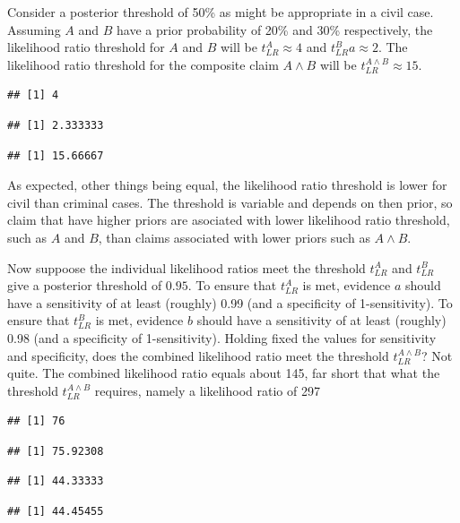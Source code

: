 \documentclass[10pt,dvipsnames,enabledeprecatedfontcommands]{scrartcl}
\begin{document}
Consider a posterior threshold of 50\% as might be appropriate in a
civil case. Assuming \(A\) and \(B\) have a prior probability of 20\%
and 30\% respectively, the likelihood ratio threshold for \(A\) and
\(B\) will be \(t_{LR}^{A}\approx 4\) and \(t_{LR}^{B}a\approx 2\). The
likelihood ratio threshold for the composite claim \(A \wedge B\) will
be \(t^{A\wedge B}_{LR}\approx 15\).

\begin{verbatim}
## [1] 4
\end{verbatim}

\begin{verbatim}
## [1] 2.333333
\end{verbatim}

\begin{verbatim}
## [1] 15.66667
\end{verbatim}

As expected, other things being equal, the likelihood ratio threshold is
lower for civil than criminal cases. The threshold is variable and
depends on then prior, so claim that have higher priors are asociated
with lower likelihood ratio threshold, such as \(A\) and \(B\), than
claims associated with lower priors such as \(A \wedge B\).

Now suppoose the individual likelihood ratios meet the threshold
\(t_{LR}^{A}\) and \(t_{LR}^{B}\) give a posterior threshold of
\(0.95\). To ensure that \(t_{LR}^{A}\) is met, evidence \(a\) should
have a sensitivity of at least (roughly) 0.99 (and a specificity of
1-sensitivity). To ensure that \(t_{LR}^{B}\) is met, evidence \(b\)
should have a sensitivity of at least (roughly) 0.98 (and a specificity
of 1-sensitivity). Holding fixed the values for sensitivity and
specificity, does the combined likelihood ratio meet the threshold
\(t_{LR}^{A\wedge B}\)? Not quite. The combined likelihood ratio equals
about 145, far short that what the threshold \(t^{A\wedge B}_{LR}\)
requires, namely a likelihood ratio of 297

\begin{verbatim}
## [1] 76
\end{verbatim}

\begin{verbatim}
## [1] 75.92308
\end{verbatim}

\begin{verbatim}
## [1] 44.33333
\end{verbatim}

\begin{verbatim}
## [1] 44.45455
\end{verbatim}
\end{document}
